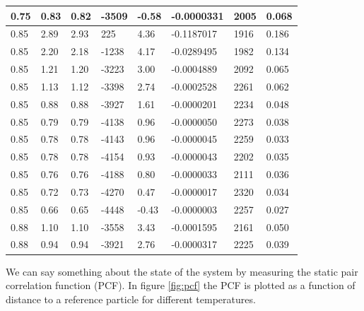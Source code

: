 \documentclass{article}
\begin{document}
\begin{table}[!htb]
\begin{tabular}{|l|l|l|l|l|l|l|l|}
0.75 & 0.83 & 0.82 & -3509 & -0.58 & -0.0000331 & 2005 & 0.068\\ \hline
0.85 & 2.89 & 2.93 & 225 & 4.36 & -0.1187017 & 1916 & 0.186\\ \hline
0.85 & 2.20 & 2.18 & -1238 & 4.17 & -0.0289495 & 1982 & 0.134\\ \hline
0.85 & 1.21 & 1.20 & -3223 & 3.00 & -0.0004889 & 2092 & 0.065\\ \hline
0.85 & 1.13 & 1.12 & -3398 & 2.74 & -0.0002528 & 2261 & 0.062\\ \hline
0.85 & 0.88 & 0.88 & -3927 & 1.61 & -0.0000201 & 2234 & 0.048\\ \hline
0.85 & 0.79 & 0.79 & -4138 & 0.96 & -0.0000050 & 2273 & 0.038\\ \hline
0.85 & 0.78 & 0.78 & -4143 & 0.96 & -0.0000045 & 2259 & 0.033\\ \hline
0.85 & 0.78 & 0.78 & -4154 & 0.93 & -0.0000043 & 2202 & 0.035\\ \hline
0.85 & 0.76 & 0.76 & -4188 & 0.80 & -0.0000033 & 2111 & 0.036\\ \hline
0.85 & 0.72 & 0.73 & -4270 & 0.47 & -0.0000017 & 2320 & 0.034\\ \hline
0.85 & 0.66 & 0.65 & -4448 & -0.43 & -0.0000003 & 2257 & 0.027\\ \hline
0.88 & 1.10 & 1.10 & -3558 & 3.43 & -0.0001595 & 2161 & 0.050\\ \hline
0.88 & 0.94 & 0.94 & -3921 & 2.76 & -0.0000317 & 2225 & 0.039 \\ \hline
\end{tabular}
\label{tab:label}
\end{table}

We can say something about the state of the system by measuring the static pair correlation function (PCF). In figure \ref{fig:pcf} the PCF is plotted as a function of distance to a reference particle for different temperatures. \\
\end{document}
